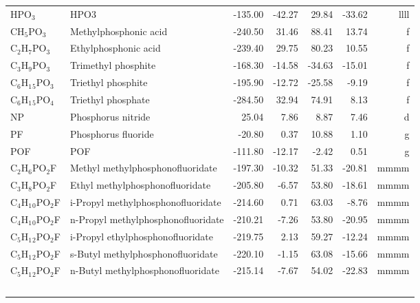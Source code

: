\begin{table}
\begin{center}
\begin{tabular}{llrrrrr}
 HPO$_3$        & HPO3                                   &  -135.00    &   -42.27  &    29.84  &   -33.62  &   llll\\
 CH$_5$PO$_3$      & Methylphosphonic acid                  &  -240.50    &    31.46  &    88.41  &    13.74  &      f\\
 C$_2$H$_7$PO$_3$     & Ethylphosphonic acid                   &  -239.40    &    29.75  &    80.23  &    10.55  &      f\\
 C$_3$H$_9$PO$_3$     & Trimethyl phosphite                    &  -168.30    &   -14.58  &   -34.63  &   -15.01  &      f\\
 C$_6$H$_1$$_5$PO$_3$    & Triethyl phosphite                     &  -195.90    &   -12.72  &   -25.58  &    -9.19  &      f\\
 C$_6$H$_1$$_5$PO$_4$    & Triethyl phosphate                     &  -284.50    &    32.94  &    74.91  &     8.13  &      f\\
 NP          & Phosphorus nitride                     &    25.04    &     7.86  &     8.87  &     7.46  &      d\\
 PF          & Phosphorus fluoride                    &   -20.80    &     0.37  &    10.88  &     1.10  &      g\\
 POF         & POF                                    &  -111.80    &   -12.17  &    -2.42  &     0.51  &      g\\
 C$_2$H$_6$PO$_2$F    & Methyl methylphosphonofluoridate       &  -197.30    &   -10.32  &    51.33  &   -20.81  &   mmmm\\
 C$_3$H$_8$PO$_2$F    & Ethyl methylphosphonofluoridate        &  -205.80    &    -6.57  &    53.80  &   -18.61  &   mmmm\\
 C$_4$H$_1$$_0$PO$_2$F   & i-Propyl methylphosphonofluoridate     &  -214.60    &     0.71  &    63.03  &    -8.76  &   mmmm\\
 C$_4$H$_1$$_0$PO$_2$F   & n-Propyl methylphosphonofluoridate     &  -210.21    &    -7.26  &    53.80  &   -20.95  &   mmmm\\
 C$_5$H$_1$$_2$PO$_2$F   & i-Propyl ethylphosphonofluoridate      &  -219.75    &     2.13  &    59.27  &   -12.24  &   mmmm\\
 C$_5$H$_1$$_2$PO$_2$F   & s-Butyl methylphosphonofluoridate      &  -220.10    &    -1.15  &    63.08  &   -15.66  &   mmmm\\
 C$_5$H$_1$$_2$PO$_2$F   & n-Butyl methylphosphonofluoridate      &  -215.14    &    -7.67  &    54.02  &   -22.83  &   mmmm\\
$$
\end{tabular}
\end{center}
\end{table}
